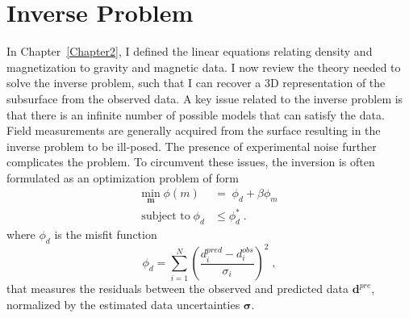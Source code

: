 \graphicspath{{./../Figures/}}
\chapter{Inverse Problem}
\label{Chapter3}
In Chapter~\ref{Chapter2}, I defined the linear equations relating density and magnetization to gravity and magnetic data. I now review the theory needed to solve the inverse problem, such that I can recover a 3D representation of the subsurface from the observed data.
A key issue related to the inverse problem is that there is an infinite number of
possible models that can satisfy the data. Field measurements are generally acquired from the surface resulting in the inverse problem to be ill-posed. The presence of experimental noise further complicates the problem.
To circumvent these issues, the inversion is often formulated as an optimization problem of form
\begin{equation}
\begin{split}\label{GenMinProb}
\underset{\mathbf{m}}{\text{min}}\; \phi(m) & = \; \phi_d + \beta \phi_m \\
\text{subject to} \; \phi_d & \leq \phi_d^* \; .
\end{split}
\end{equation}
where $\phi_d$ is the misfit function
\begin{equation}\label{eq:misfit}
\phi_d =\sum_{i=1}^{N}\left(\frac{d_i^{pred} - {d}_i^{obs}}{\sigma_i}\right)^2 \;,
\end{equation}
that measures the residuals between the observed and predicted data $\mathbf{d}^{pre}$, normalized by the estimated data uncertainties $\boldsymbol{\sigma}$.

